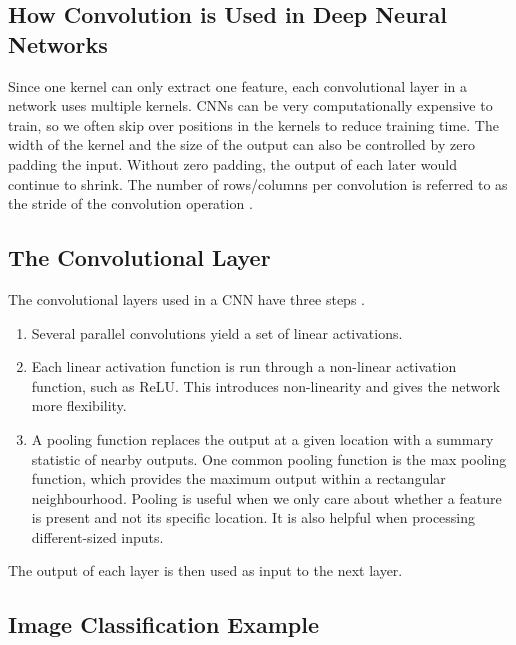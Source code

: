 \documentclass{article}
\begin{document}
\subsection{How Convolution is Used in Deep Neural Networks}

Since one kernel can only extract one feature, each convolutional layer in a network uses multiple kernels. CNNs can be very computationally expensive to train, so we often skip over positions in the kernels to reduce training time. The width of the kernel and the size of the output can also be controlled by zero padding the input. Without zero padding, the output of each later would continue to shrink. The number of rows/columns per convolution is referred to as the stride of the convolution operation \cite{Goodfellow-et-al-2016}. %


\subsection{The Convolutional Layer}

The convolutional layers used in a CNN have three steps \cite{Goodfellow-et-al-2016}.

\begin{enumerate}
    \item Several parallel convolutions yield a set of linear activations.
    \item Each linear activation function is run through a non-linear activation function, such as ReLU. This introduces non-linearity and gives the network more flexibility. %
    \item A pooling function replaces the output at a given location with a summary statistic of nearby outputs. One common pooling function is the max pooling function, which provides the maximum output within a rectangular neighbourhood. Pooling is useful when we only care about whether a feature is present and not its specific location. It is also helpful when processing different-sized inputs.
\end{enumerate}

The output of each layer is then used as input to the next layer.

\subsection{Image Classification Example}
\end{document}
